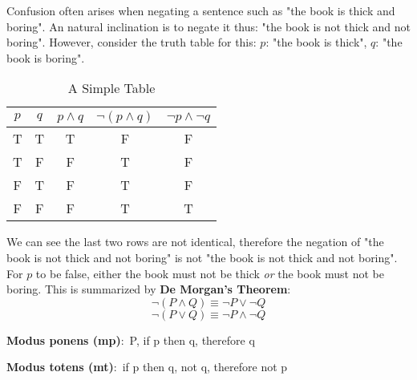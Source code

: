 \documentclass[nobib]{tufte-handout}
\newcommand{\defn}[2]{\noindent\textbf{#1}:\ #2}
\begin{document}
Confusion often arises when negating a sentence such as 
"the book is thick and boring". An natural inclination is to 
negate it thus: "the book is not thick and not boring".
However, consider the truth table for this:
$p$: "the book is thick", $q$: "the book is boring". 
\begin{table}[ht]
    \centering
    \begin{tabular}{|c c|c|c|c|}
    \hline
    $p$ & $q$ & $p \wedge q$ & $\neg(p \wedge q)$ & $\neg p \wedge \neg q$\\
    \hline
    T & T & T & F & F\\
    T & F & F & T & F\\
    F & T & F & T & F\\
    F & F & F & T & T\\
    \hline
    \end{tabular}
    \caption{A Simple Table}
    \label{tab:demorganswrong}
\end{table}
We can see the last two rows are not identical, therefore
the negation of "the book is not thick and not boring"
is not "the book is not thick and not boring". For $p$ to 
be false, either the book must not be thick \emph{or} the
book must not be boring. This is summarized by 
\defn{De Morgan's Theorem}{
    \[\neg(P \wedge Q) \equiv \neg P \vee \neg Q\]
    \[\neg(P \vee Q) \equiv \neg P \wedge \neg Q\]
}

\defn{Modus ponens (mp)}{P, if p then q, therefore q}

\defn{Modus totens (mt)}{if p then q, not q, therefore not p}

\end{document}
